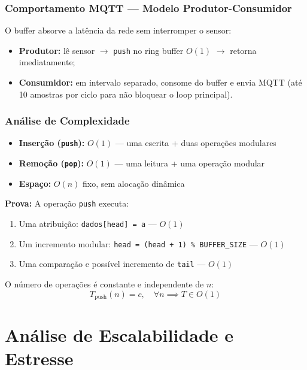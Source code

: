\documentclass[12pt, a4paper]{article}
\begin{document}
\subsubsection{Comportamento MQTT --- Modelo Produtor-Consumidor}

O buffer absorve a latência da rede sem interromper o sensor:
\begin{itemize}
    \item \textbf{Produtor:} lê sensor $\rightarrow$ \texttt{push} no ring buffer $O(1)$ $\rightarrow$ retorna imediatamente;
    \item \textbf{Consumidor:} em intervalo separado, consome do buffer e envia MQTT (até 10 amostras por ciclo para não bloquear o loop principal).
\end{itemize}

\subsubsection{Análise de Complexidade}

\begin{itemize}
    \item \textbf{Inserção (\texttt{push}):} $O(1)$ --- uma escrita + duas operações modulares
    \item \textbf{Remoção (\texttt{pop}):} $O(1)$ --- uma leitura + uma operação modular
    \item \textbf{Espaço:} $O(n)$ fixo, sem alocação dinâmica
\end{itemize}

\textbf{Prova:} A operação \texttt{push} executa:
\begin{enumerate}
    \item Uma atribuição: \texttt{dados[head] = a} --- $O(1)$
    \item Um incremento modular: \texttt{head = (head + 1) \% BUFFER\_SIZE} --- $O(1)$
    \item Uma comparação e possível incremento de \texttt{tail} --- $O(1)$
\end{enumerate}

O número de operações é constante e independente de $n$:
\[
T_{\text{push}}(n) = c, \quad \forall n \implies T \in O(1)
\]

\section{Análise de Escalabilidade e Estresse}
\end{document}
